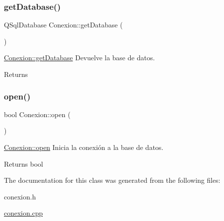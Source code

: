 \subsubsection{\texorpdfstring{get\+Database()}{getDatabase()}}
{\footnotesize\ttfamily Q\+Sql\+Database Conexion\+::get\+Database (\begin{DoxyParamCaption}{ }\end{DoxyParamCaption})}



\mbox{\hyperlink{classConexion_adf8045b7fd9daf7a47528d1c32eda4d2}{Conexion\+::get\+Database}} Devuelve la base de datos. 

\begin{DoxyReturn}{Returns}

\end{DoxyReturn}
\mbox{\label{classConexion_af697de4217c41446258b49844b4d85c1}} 
\subsubsection{\texorpdfstring{open()}{open()}}
{\footnotesize\ttfamily bool Conexion\+::open (\begin{DoxyParamCaption}{ }\end{DoxyParamCaption})}



\mbox{\hyperlink{classConexion_af697de4217c41446258b49844b4d85c1}{Conexion\+::open}} Inicia la conexión a la base de datos. 

\begin{DoxyReturn}{Returns}
bool 
\end{DoxyReturn}


The documentation for this class was generated from the following files\+:\begin{DoxyCompactItemize}
\item 
conexion.\+h\item 
\mbox{\hyperlink{conexion_8cpp}{conexion.\+cpp}}\end{DoxyCompactItemize}
